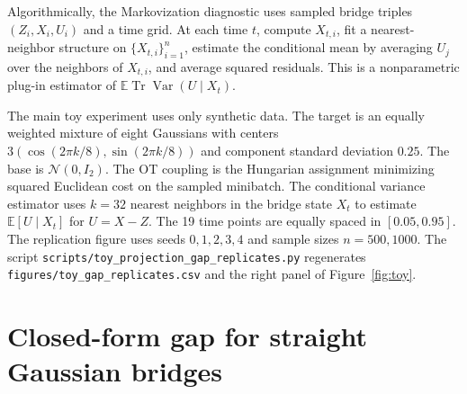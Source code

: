 \documentclass{article}
\numberwithin{equation}{section}
\newcommand{\E}{\mathbb{E}}
\newcommand{\Var}{\operatorname{Var}}
\newcommand{\Tr}{\operatorname{Tr}}
\begin{document}
Algorithmically, the Markovization diagnostic uses sampled bridge triples $(Z_i,X_i,U_i)$ and a time grid. At each time $t$, compute $X_{t,i}$, fit a nearest-neighbor structure on $\{X_{t,i}\}_{i=1}^n$, estimate the conditional mean by averaging $U_j$ over the neighbors of $X_{t,i}$, and average squared residuals. This is a nonparametric plug-in estimator of $\E\Tr\Var(U\mid X_t)$.

The main toy experiment uses only synthetic data. The target is an equally weighted mixture of eight Gaussians with centers $3(\cos(2\pi k/8),\sin(2\pi k/8))$ and component standard deviation $0.25$. The base is $\mathcal N(0,I_2)$. The OT coupling is the Hungarian assignment minimizing squared Euclidean cost on the sampled minibatch. The conditional variance estimator uses $k=32$ nearest neighbors in the bridge state $X_t$ to estimate $\E[U\mid X_t]$ for $U=X-Z$. The 19 time points are equally spaced in $[0.05,0.95]$. The replication figure uses seeds $0,1,2,3,4$ and sample sizes $n=500,1000$. The script \texttt{scripts/toy\_projection\_gap\_replicates.py} regenerates \texttt{figures/toy\_gap\_replicates.csv} and the right panel of Figure~\ref{fig:toy}.


\section{Closed-form gap for straight Gaussian bridges}
\label{app:gaussian_gap}
\end{document}
